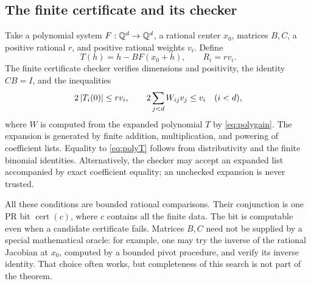 \subsection{The finite certificate and its checker}

Take a polynomial system \(F:\mathbb Q^d\to\mathbb Q^d\), a rational center \(x_0\), matrices \(B,C\), a positive rational \(r\), and positive rational weights \(v_i\). Define
\begin{equation}\label{eq:polyT}
 T(h)=h-BF(x_0+h),\qquad R_i=r v_i.
\end{equation}
The finite certificate checker verifies dimensions and positivity, the identity \(CB=I\), and the inequalities
\begin{equation}\label{eq:polycert}
 2\left|T_i(0)\right|\le r v_i,\qquad
 2\sum_{j<d}W_{ij}v_j\le v_i\quad(i<d),
\end{equation}
where \(W\) is computed from the expanded polynomial \(T\) by \eqref{eq:polygain}. The expansion is generated by finite addition, multiplication, and powering of coefficient lists. Equality to \eqref{eq:polyT} follows from distributivity and the finite binomial identities. Alternatively, the checker may accept an expanded list accompanied by exact coefficient equality; an unchecked expansion is never trusted.

All these conditions are bounded rational comparisons. Their conjunction is one PR bit \(\operatorname{cert}(c)\), where \(c\) contains all the finite data. The bit is computable even when a candidate certificate fails. Matrices \(B,C\) need not be supplied by a special mathematical oracle: for example, one may try the inverse of the rational Jacobian at \(x_0\), computed by a bounded pivot procedure, and verify its inverse identity. That choice often works, but completeness of this search is not part of the theorem.

